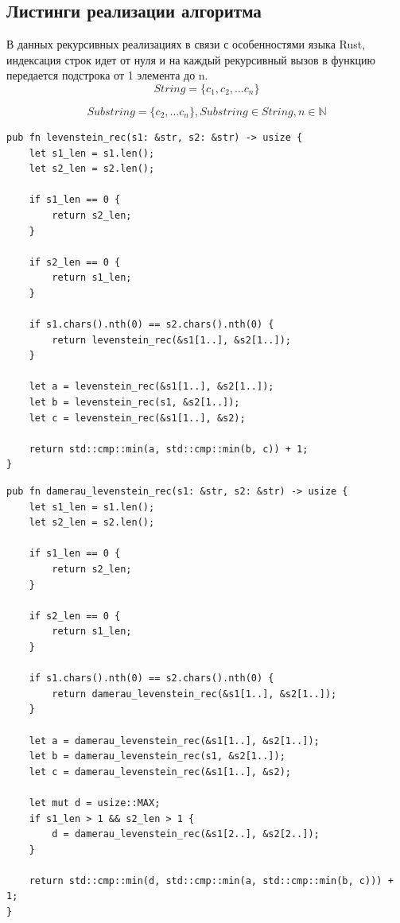 \documentclass[14pt,russian]{scrartcl}
\begin{document}
\subsection{Листинги реализации алгоритма}

В данных рекурсивных реализациях в связи с особенностями языка Rust, индексация строк идет от нуля и на каждый рекурсивный вызов в функцию передается подстрока от 1 элемента до n.
\begin{equation*} 
	String = \{ c_1, c_2, \dotso c_n \}
\end{equation*}

\begin{equation*}
	Substring = \{ c_2, \dotso c_n \},  Substring \in String, n \in \mathbb{N}
\end{equation*}
		
\begin{lstlisting}[label=some-code,caption=Функция нахождения расстояния Левенштейна рекурсивно]
pub fn levenstein_rec(s1: &str, s2: &str) -> usize {
	let s1_len = s1.len();
	let s2_len = s2.len();

	if s1_len == 0 {
		return s2_len;
	}

	if s2_len == 0 {
		return s1_len;
	}   

	if s1.chars().nth(0) == s2.chars().nth(0) {
		return levenstein_rec(&s1[1..], &s2[1..]);
	}

	let a = levenstein_rec(&s1[1..], &s2[1..]);
	let b = levenstein_rec(s1, &s2[1..]);
	let c = levenstein_rec(&s1[1..], &s2);

	return std::cmp::min(a, std::cmp::min(b, c)) + 1;
}
\end{lstlisting}

\newpage

\begin{lstlisting}[label=some-code,caption=Функция нахождения расстояния Дамерау-Левенштейна рекурсивно]
pub fn damerau_levenstein_rec(s1: &str, s2: &str) -> usize {
	let s1_len = s1.len();
	let s2_len = s2.len();

	if s1_len == 0 {
		return s2_len;
	}

	if s2_len == 0 {
		return s1_len;
	}   

	if s1.chars().nth(0) == s2.chars().nth(0) {
		return damerau_levenstein_rec(&s1[1..], &s2[1..]);
	}

	let a = damerau_levenstein_rec(&s1[1..], &s2[1..]);
	let b = damerau_levenstein_rec(s1, &s2[1..]);
	let c = damerau_levenstein_rec(&s1[1..], &s2);

	let mut d = usize::MAX;
	if s1_len > 1 && s2_len > 1 {
		d = damerau_levenstein_rec(&s1[2..], &s2[2..]);
	}

	return std::cmp::min(d, std::cmp::min(a, std::cmp::min(b, c))) + 1;
}

\end{lstlisting}
\end{document}
